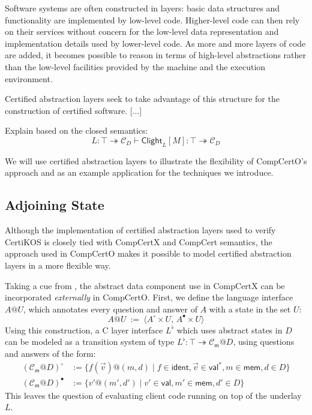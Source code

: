 \documentclass[acmsmall,screen,review,anonymous]{acmart}
\newcommand{\kw}[1]{\ensuremath{ \mathsf{#1} }}
\newcommand{\que}{\circ}
\newcommand{\ans}{\bullet}
\begin{document}
Software systems are often constructed in layers:
basic data structures and functionality
are implemented by low-level code.
Higher-level code can then rely on their services
without concern for the low-level data representation
and implementation details used by lower-level code.
As more and more layers of code are added,
it becomes possible to reason in terms of
high-level abstractions rather than
the low-level facilities provided by the machine
and the execution environment.

Certified abstraction layers
seek to take advantage of this structure
for the construction of certified software.
[...]

Explain based on the closed semantics:
\[
    L : \top \twoheadrightarrow \mathcal{C}_D \vdash
    \kw{Clight}_L[M] : \top \twoheadrightarrow \mathcal{C}_D
\]

We will use certified abstraction layers
to illustrate the flexibility of CompCertO's approach
and as an example application for the techniques we introduce.

\subsection{Adjoining State} \label{sec:overview:slift} %

Although the implementation of certified abstraction layers
used to verify CertiKOS
is closely tied with CompCertX and CompCert semantics,
the approach used in CompCertO
makes it possible to model certified abstraction layers
in a more flexible way.

Taking a cue from \citep{rbgs-cal},
the abstract data component use in CompCertX
can be incorporated \emph{externally} in CompCertO.
First,
we define the language interface $A@U$,
which annotates every question and answer of $A$
with a state in the set $U$:
\[
  A@U \: := \:
    \langle A^\que \times U, \, A^\ans \times U \rangle
\]
Using this construction,
a C layer interface $L^\flat$ which uses abstract states in $D$
can be modeled as a transition system of type
$
  L^\flat : \top \twoheadrightarrow \mathcal{C}_\kw{m}@D
$,
using questions and answers of the form:
\begin{align*}
  (\mathcal{C}_\kw{m}@D)^\que &:=
    \{ f(\vec{v})@(m, d) \mid
       f \in \kw{ident},
       \vec{v} \in \kw{val}^*,
       m \in \kw{mem},
       d \in D \}
  \\
  (\mathcal{C}_\kw{m}@D)^\ans &:=
    \{ v'@(m', d') \mid
       v' \in \kw{val},
       m' \in \kw{mem},
       d' \in D \}
\end{align*}
This leaves the question of evaluating client code
running on top of the underlay $L$.
\end{document}
